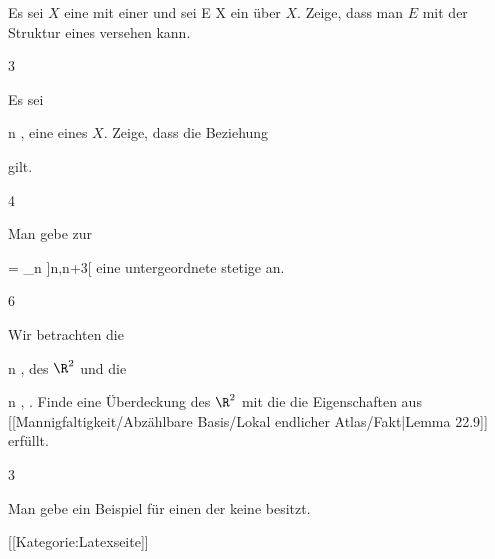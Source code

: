 {}
{

Es sei $X$ eine
mit einer
und sei
 { E } { X
} {}
ein
über $X$. Zeige, dass man $E$ mit der Struktur eines
versehen kann.

}
{} {}


{3}
{

Es sei

 {}
 {n \in \N} {}
 {} {} {} {,}
eine
 eines
 $X$. Zeige, dass die Beziehung

 {  }
 gilt.

}
{} {}

{4}
{

Man gebe zur

\mavergleichskettedisp
{\vergleichskette
{ \R
}
{ =} { \bigcup_{n \in \Z} ]n,n+3[
}
{ } {
}
{ } {
}
{ } {
}
}
{}{}{}
eine untergeordnete stetige
an.

}
{} {}

{6}
{

Wir betrachten die

 {}
 {n \in \N} {}
 {} {} {} {,}
des $\R^2$ und die

 {}
 {n \in \N} {}
 {} {} {} {,}
 {} {.}
Finde eine Überdeckung des $\R^2$ mit
die die Eigenschaften
aus [[Mannigfaltigkeit/Abzählbare Basis/Lokal endlicher Atlas/Fakt|Lemma 22.9]]
 {} {}
erfüllt.

}
{} {}

{3}
{

Man gebe ein Beispiel für einen
der keine
besitzt.

}
{} {}

 [[Kategorie:Latexseite]]
